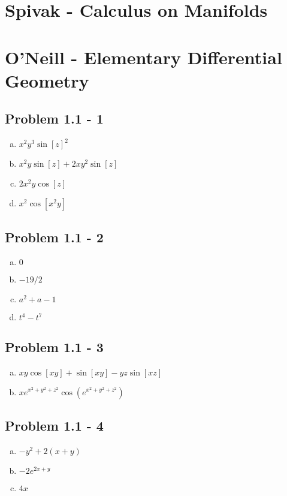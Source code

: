 \documentclass[../main.tex]{subfiles}
\begin{document}
\section{{\sc Spivak} - Calculus on Manifolds}

\section{{\sc O'Neill} - Elementary Differential Geometry}
\subsection{Problem 1.1 - 1}
\begin{enumerate}[(a)]
\item $x^2 y^3 \sin[z]^2$
\item $x^2 y \sin[z] + 2 x y^2 \sin[z]$
\item $2 x^2 y \cos[z]$
\item $x^2 \cos[x^2 y]$
\end{enumerate}

\subsection{Problem 1.1 - 2}
\begin{enumerate}[(a)]
\item $0$
\item $-19/2$
\item $a^2+a-1$
\item $t^4-t^7$
\end{enumerate}

\subsection{Problem 1.1 - 3}
\begin{enumerate}[(a)]
\item $xy \cos[x y] + \sin[x y] - y z \sin[x z]$
\item $ x e^{x^2 + y^2 + z^2} \cos(e^{x^2 + y^2 + z^2})$
\end{enumerate}

\subsection{Problem 1.1 - 4}
\begin{enumerate}[(a)]
\item $-y^2 + 2 (x + y)$
\item $-2 e^{2 x + y}$
\item $4x$
\end{enumerate}
\end{document}
